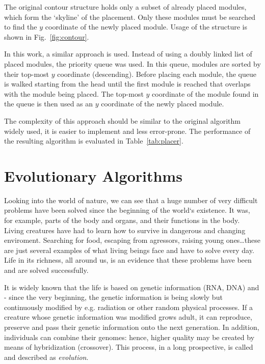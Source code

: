 The original contour structure \cite{otree} holds only a subset of already placed modules, which form the `skyline' of the placement. Only these modules must be searched to find the $y$ coordinate of the newly placed module. Usage of the structure is shown in Fig.~\ref{fig:contour}.

In this work, a similar approach is used. Instead of using a doubly linked list of placed modules, the priority queue was used. In this queue, modules are sorted by their top-most $y$ coordinate (descending). Before placing each module, the queue is walked starting from the head until the first module is reached that overlaps with the module being placed. The top-most $y$ coordinate of the module found in the queue is then used as an $y$ coordinate of the newly placed module.

The complexity of this approach should be similar to the original algorithm widely used, it is easier to implement and less error-prone. The performance of the resulting algorithm is evaluated in Table~\ref{tab:placer}.

\section{Evolutionary Algorithms}

\cite{vh} Looking into the world of nature, we can see that a huge number of very difficult problems have been solved since the beginning of the world‘s existence. It was, for example, parts of the body and organs, and their functions in the body. Living creatures have had to learn how to survive in dangerous and changing enviroment. Searching for food, escaping from agressors, raising young ones\ldots these are just several examples of what living beings face and have to solve every day. Life in its richness, all around us, is an evidence that these problems have been and are solved successfully.

It is widely known that the life is based on genetic information (RNA, DNA) and - since the very beginning, the genetic information is being slowly but continuously modified by e.g. radiation or other random physical processes. If a creature whose genetic information was modified grows adult, it can reproduce, preserve and pass their genetic information onto the next generation. In addition, individuals can combine their genomes: hence, higher quality may be created by means of hybridization (crossover). This process, in a long prospective, is called and described as {\em evolution}.


